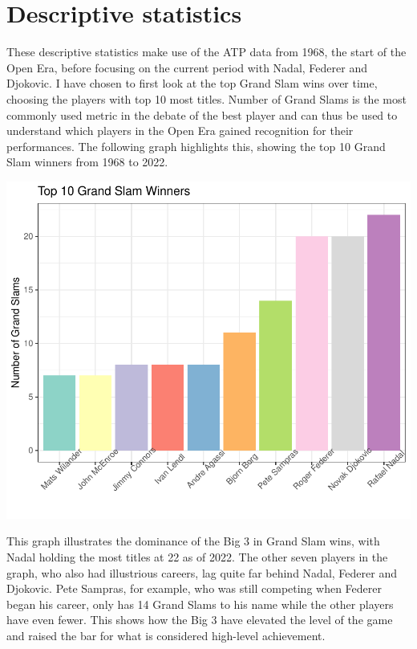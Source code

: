 \documentclass[11pt,preprint, authoryear]{elsarticle}
\numberwithin{equation}{section}
\numberwithin{figure}{section}
\numberwithin{table}{section}
\begin{document}
\hypertarget{descriptive-statistics}{%
\section{Descriptive statistics}\label{descriptive-statistics}}

These descriptive statistics make use of the ATP data from 1968, the
start of the Open Era, before focusing on the current period with Nadal,
Federer and Djokovic. I have chosen to first look at the top Grand Slam
wins over time, choosing the players with top 10 most titles. Number of
Grand Slams is the most commonly used metric in the debate of the best
player and can thus be used to understand which players in the Open Era
gained recognition for their performances. The following graph
highlights this, showing the top 10 Grand Slam winners from 1968 to
2022.

\includegraphics{Write-up_files/figure-latex/GS winners-1.pdf}

This graph illustrates the dominance of the Big 3 in Grand Slam wins,
with Nadal holding the most titles at 22 as of 2022. The other seven
players in the graph, who also had illustrious careers, lag quite far
behind Nadal, Federer and Djokovic. Pete Sampras, for example, who was
still competing when Federer began his career, only has 14 Grand Slams
to his name while the other players have even fewer. This shows how the
Big 3 have elevated the level of the game and raised the bar for what is
considered high-level achievement.
\end{document}

